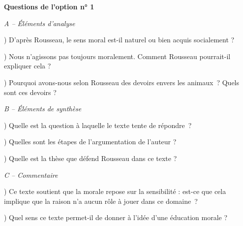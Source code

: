 \documentclass[french,12pt]{article}
\newcommand{\elementsAnalyseA}{D'après Rousseau, le sens moral est-il naturel ou bien acquis socialement ?}
\newcommand{\elementsAnalyseB}{Nous n'agissons pas toujours moralement. Comment Rousseau pourrait-il expliquer cela ?}
\newcommand{\elementsAnalyseC}{Pourquoi avons-nous selon Rousseau des devoirs envers \linebreak les animaux~? Quels sont ces devoirs ?}
\newcommand{\elementsSyntheseA}{Quelle est la question à laquelle le texte tente de répondre~?}
\newcommand{\elementsSyntheseB}{Quelles sont les étapes de l'argumentation de l'auteur ?}
\newcommand{\elementsSyntheseC}{Quelle est la thèse que défend Rousseau dans ce texte ?}
\newcommand{\commentaireA}{Ce texte soutient que la morale repose sur la sensibilité : \linebreak est-ce que cela implique que la raison n'a aucun rôle à jouer dans ce domaine~?}
\newcommand{\commentaireB}{Quel sens ce texte permet-il de donner à l'idée d'une éducation morale ?}
\begin{document}
\leftskip=0cm
\large{\noindent \textbf{Questions de l’option n° 1}

\vspace*{0.5cm}

\noindent \textit{A – Éléments d'analyse}

\leftskip=1cm

) \elementsAnalyseA

) \elementsAnalyseB

) \elementsAnalyseC



\vspace*{0.5cm}

\leftskip=0cm
\noindent \textit{B – Éléments de synthèse}

\leftskip=1cm
) \elementsSyntheseA

) \elementsSyntheseB

) \elementsSyntheseC


\vspace*{0.5cm}

\leftskip=0cm
\noindent \textit{C – Commentaire}

\leftskip=1cm

) \commentaireA

) \commentaireB

}
\end{document}
